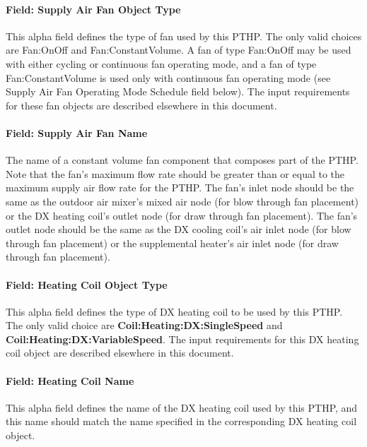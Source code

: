 \paragraph{Field: Supply Air Fan Object Type}\label{field-supply-air-fan-object-type-6}

This alpha field defines the type of fan used by this PTHP. The only valid choices are Fan:OnOff and Fan:ConstantVolume. A fan of type Fan:OnOff may be used with either cycling or continuous fan operating mode, and a fan of type Fan:ConstantVolume is used only with continuous fan operating mode (see Supply Air Fan Operating Mode Schedule field below). The input requirements for these fan objects are described elsewhere in this document.

\paragraph{Field: Supply Air Fan Name}\label{field-supply-air-fan-name-5}

The name of a constant volume fan component that composes part of the PTHP. Note that the fan's maximum flow rate should be greater than or equal to the maximum supply air flow rate for the PTHP. The fan's inlet node should be the same as the outdoor air mixer's mixed air node (for blow through fan placement) or the DX heating coil's outlet node (for draw through fan placement). The fan's outlet node should be the same as the DX cooling coil's air inlet node (for blow through fan placement) or the supplemental heater's air inlet node (for draw through fan placement).

\paragraph{Field: Heating Coil Object Type}\label{field-heating-coil-object-type-4-000}

This alpha field defines the type of DX heating coil to be used by this PTHP. The only valid choice are \textbf{Coil:Heating:DX:SingleSpeed} and \textbf{Coil:Heating:DX:VariableSpeed}. The input requirements for this DX heating coil object are described elsewhere in this document.

\paragraph{Field: Heating Coil Name}\label{field-heating-coil-name-4-000}

This alpha field defines the name of the DX heating coil used by this PTHP, and this name should match the name specified in the corresponding DX heating coil object.

